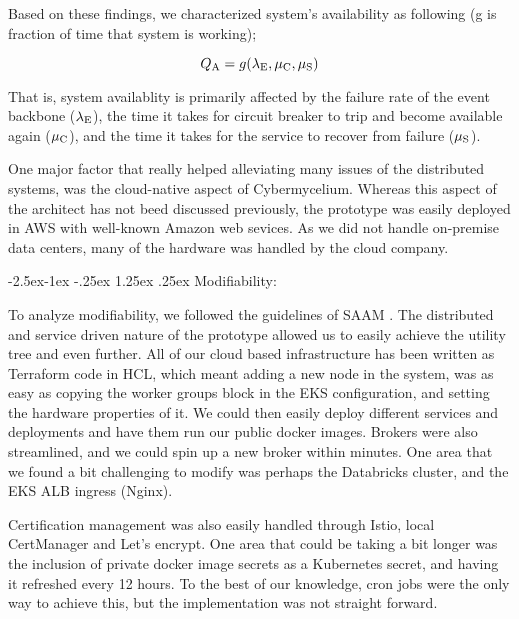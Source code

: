 \documentclass[review]{elsarticle}
\makeatletter
\renewcommand\paragraph{\@startsection{paragraph}{4}{\z@}%
            {-2.5ex\@plus -1ex \@minus -.25ex}%
            {1.25ex \@plus .25ex}%
            {\normalfont\normalsize\itshape}}
\makeatother
\begin{document}
Based on these findings, we characterized system's availability as following (g is fraction of time that system is working);

\begin{equation}
    Q\textsubscript{A} = g(\lambda\textsubscript{E} , \mu\textsubscript{C}, \mu\textsubscript{S})
\end{equation}

That is, system availablity is primarily affected by the failure rate of the event backbone ($\lambda \textsubscript{E}$), the time it takes for circuit breaker to trip and become available again ($\mu\textsubscript{C}$), and the time it takes for the service to recover from failure ($\mu\textsubscript{S}$).

One major factor that really helped alleviating many issues of the distributed systems, was the cloud-native aspect of Cybermycelium. Whereas this aspect of the architect has not beed discussed previously, the prototype was easily deployed in AWS with well-known Amazon web sevices. As we did not handle on-premise data centers, many of the hardware was handled by the cloud company.

\paragraph{Modifiability:}

To analyze modifiability, we followed the guidelines of SAAM \cite{kazman1994saam}. The distributed and service driven nature of the prototype allowed us to easily achieve the utility tree and even further. All of our cloud based infrastructure has been written as Terraform code in HCL, which meant adding a new node in the system, was as easy as copying the worker groups block in the EKS configuration, and setting the hardware properties of it. We could then easily deploy different services and deployments and have them run our public docker images. Brokers were also streamlined, and we could spin up a new broker within minutes. One area that we found a bit challenging to modify was perhaps the Databricks cluster, and the EKS ALB ingress (Nginx).

Certification management was also easily handled through Istio, local CertManager and Let's encrypt. One area that could be taking a bit longer was the inclusion of private docker image secrets as a Kubernetes secret, and having it refreshed every 12 hours. To the best of our knowledge, cron jobs were the only way to achieve this, but the implementation was not straight forward.
\end{document}
